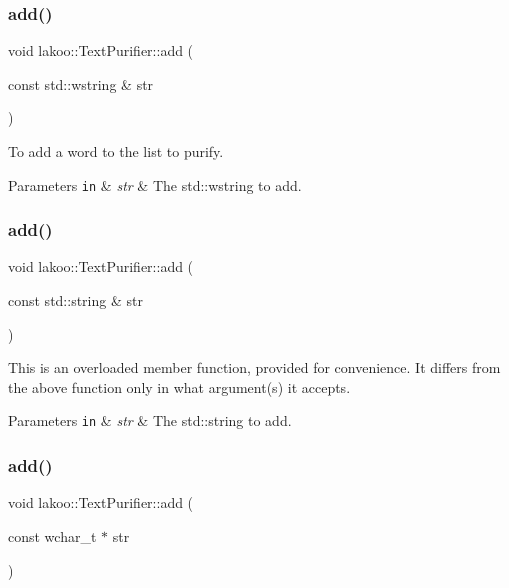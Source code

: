 \subsubsection{\texorpdfstring{add()}{add()}\hspace{0.1cm}{\footnotesize\ttfamily [1/8]}}
{\footnotesize\ttfamily void lakoo\+::\+Text\+Purifier\+::add (\begin{DoxyParamCaption}\item[{const std\+::wstring \&}]{str }\end{DoxyParamCaption})}



To add a word to the list to purify. 


\begin{DoxyParams}[1]{Parameters}
\mbox{\tt in}  & {\em str} & The std\+::wstring to add. \\
\hline
\end{DoxyParams}
\mbox{\label{classlakoo_1_1_text_purifier_a7a898c7d01f97ed6a275d2b6cf631746}} 
\subsubsection{\texorpdfstring{add()}{add()}\hspace{0.1cm}{\footnotesize\ttfamily [2/8]}}
{\footnotesize\ttfamily void lakoo\+::\+Text\+Purifier\+::add (\begin{DoxyParamCaption}\item[{const std\+::string \&}]{str }\end{DoxyParamCaption})}

This is an overloaded member function, provided for convenience. It differs from the above function only in what argument(s) it accepts. 
\begin{DoxyParams}[1]{Parameters}
\mbox{\tt in}  & {\em str} & The std\+::string to add. \\
\hline
\end{DoxyParams}
\mbox{\label{classlakoo_1_1_text_purifier_ae8d3ed1b3f6b05bc5e0a103e60200f86}} 
\subsubsection{\texorpdfstring{add()}{add()}\hspace{0.1cm}{\footnotesize\ttfamily [3/8]}}
{\footnotesize\ttfamily void lakoo\+::\+Text\+Purifier\+::add (\begin{DoxyParamCaption}\item[{const wchar\+\_\+t $\ast$}]{str }\end{DoxyParamCaption})}

